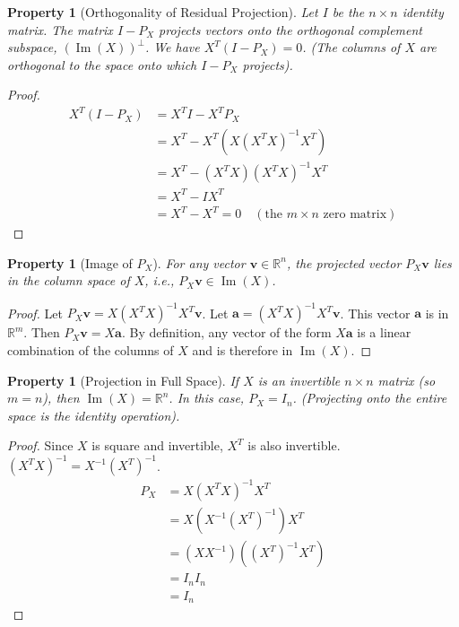 \documentclass[11pt]{article}
\newtheorem{property}[theorem]{Property}
\theoremstyle{definition}
\DeclareMathOperator{\Image}{Im} %
\newcommand{\vect}[1]{\mathbf{#1}} %
\begin{document}
\begin{property}[Orthogonality of Residual Projection]
Let $I$ be the $n \times n$ identity matrix. The matrix $I - P_X$ projects vectors onto the orthogonal complement subspace, $(\Image(X))^{\perp}$. We have $X^T (I - P_X) = 0$. (The columns of $X$ are orthogonal to the space onto which $I - P_X$ projects).
\end{property}
\begin{proof}
\begin{align*}
X^T (I - P_X) &= X^T I - X^T P_X \\
&= X^T - X^T (X(X^T X)^{-1} X^T) \\
&= X^T - (X^T X) (X^T X)^{-1} X^T \\
&= X^T - I X^T \\
&= X^T - X^T = 0 \quad (\text{the } m \times n \text{ zero matrix})
\end{align*}
\end{proof}

\begin{property}[Image of $P_X$]
For any vector $\vect{v} \in \mathbb{R}^n$, the projected vector $P_X \vect{v}$ lies in the column space of $X$, i.e., $P_X \vect{v} \in \Image(X)$.
\end{property}
\begin{proof}
Let $P_X \vect{v} = X(X^T X)^{-1} X^T \vect{v}$. Let $\vect{a} = (X^T X)^{-1} X^T \vect{v}$. This vector $\vect{a}$ is in $\mathbb{R}^m$. Then $P_X \vect{v} = X\vect{a}$. By definition, any vector of the form $X\vect{a}$ is a linear combination of the columns of $X$ and is therefore in $\Image(X)$.
\end{proof}

\begin{property}[Projection in Full Space]
If $X$ is an invertible $n \times n$ matrix (so $m=n$), then $\Image(X) = \mathbb{R}^n$. In this case, $P_X = I_n$. (Projecting onto the entire space is the identity operation).
\end{property}
\begin{proof}
Since $X$ is square and invertible, $X^T$ is also invertible. $(X^T X)^{-1} = X^{-1}(X^T)^{-1}$.
\begin{align*}
P_X &= X(X^T X)^{-1} X^T \\
&= X (X^{-1}(X^T)^{-1}) X^T \\
&= (X X^{-1}) ((X^T)^{-1} X^T) \\
&= I_n I_n \\
&= I_n
\end{align*}
\end{proof}
\end{document}
